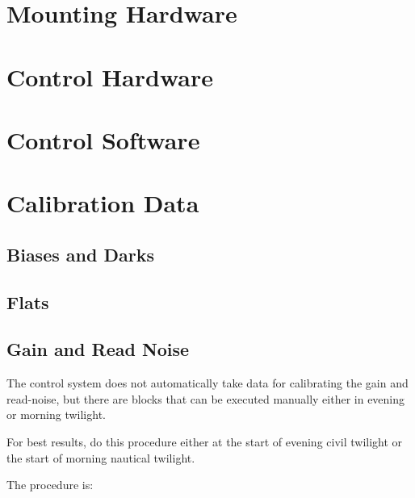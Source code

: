 \section{Mounting Hardware}

\section{Control Hardware}

\section{Control Software}

\section{Calibration Data}

\subsection{Biases and Darks}

\subsection{Flats}

\subsection{Gain and Read Noise}

The control system does not automatically take data for calibrating the gain and read-noise, but there are blocks that can be executed manually either in evening or morning twilight. 

For best results, do this procedure either at the start of evening civil twilight or the start of morning nautical twilight.

The procedure is:

